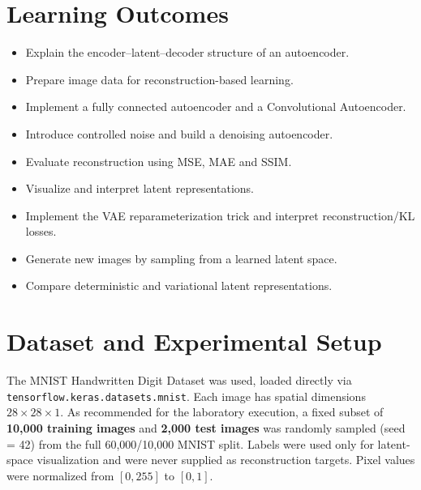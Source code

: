 \documentclass[10pt]{article}
\begin{document}
\section{Learning Outcomes}

\begin{itemize}
\item Explain the encoder--latent--decoder structure of an autoencoder.
\item Prepare image data for reconstruction-based learning.
\item Implement a fully connected autoencoder and a Convolutional Autoencoder.
\item Introduce controlled noise and build a denoising autoencoder.
\item Evaluate reconstruction using MSE, MAE and SSIM.
\item Visualize and interpret latent representations.
\item Implement the VAE reparameterization trick and interpret reconstruction/KL losses.
\item Generate new images by sampling from a learned latent space.
\item Compare deterministic and variational latent representations.
\end{itemize}

\section{Dataset and Experimental Setup}

The MNIST Handwritten Digit Dataset was used, loaded directly via
\texttt{tensorflow.keras.datasets.mnist}. Each image has spatial dimensions $28\times28\times1$.
As recommended for the laboratory execution, a fixed subset of \textbf{10{,}000 training images} and
\textbf{2{,}000 test images} was randomly sampled (seed = 42) from the full 60{,}000/10{,}000 MNIST
split. Labels were used only for latent-space visualization and were never supplied as reconstruction
targets. Pixel values were normalized from $[0,255]$ to $[0,1]$.
\end{document}
